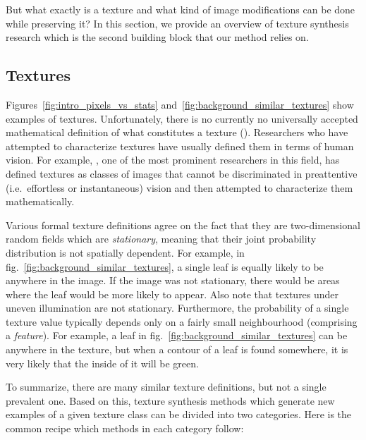 But what exactly is a texture and what kind of image modifications can be done while preserving it? In this section, we provide an overview of texture synthesis research which is the second building block that our method relies on.

\subsection{Textures}
\label{section:background-texture_synthesis-textures}

Figures~\ref{fig:intro_pixels_vs_stats} and~\ref{fig:background_similar_textures} show examples of textures. Unfortunately, there is no currently no universally accepted mathematical definition of what constitutes a texture (\citet{Raad2018}). Researchers who have attempted to characterize textures have usually defined them in terms of human vision. For example, \citet{Julesz1962}, one of the most prominent researchers in this field, has defined textures as classes of images that cannot be discriminated in preattentive (i.e.~effortless or instantaneous) vision and then attempted to characterize them mathematically.

Various formal texture definitions agree on the fact that they are two-dimensional random fields which are \textit{stationary}, meaning that their joint probability distribution is not spatially dependent. For example, in fig.~\ref{fig:background_similar_textures}, a single leaf is equally likely to be anywhere in the image. If the image was not stationary, there would be areas where the leaf would be more likely to appear. Also note that textures under uneven illumination are not stationary. Furthermore, the probability of a single texture value typically depends only on a fairly small neighbourhood (comprising a \textit{feature}). For example, a leaf in fig.~\ref{fig:background_similar_textures} can be anywhere in the texture, but when a contour of a leaf is found somewhere, it is very likely that the inside of it will be green. 

To summarize, there are many similar texture definitions, but not a single prevalent one. Based on this, texture synthesis methods which generate new examples of a given texture class can be divided into two categories. Here is the common recipe which methods in each category follow:

